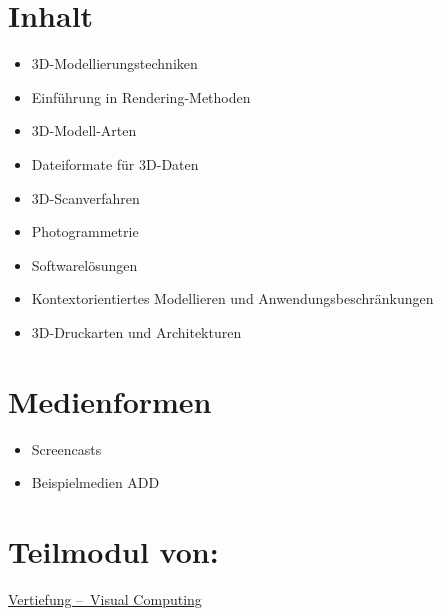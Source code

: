 \hypertarget{inhaltpathlabelmi-2017modulbeschreibungen-bachelorba_wpf-3d-msd}{%
\section*{Inhalt\label{/mi-2017/modulbeschreibungen-bachelor/BA_WPF-3D-MSD}}\label{inhaltpathlabelmi-2017modulbeschreibungen-bachelorba_wpf-3d-msd}}

\begin{itemize}
\tightlist
\item
  3D-Modellierungstechniken
\item
  Einführung in Rendering-Methoden
\item
  3D-Modell-Arten
\item
  Dateiformate für 3D-Daten
\item
  3D-Scanverfahren
\item
  Photogrammetrie
\item
  Softwarelösungen
\item
  Kontextorientiertes Modellieren und Anwendungsbeschränkungen
\item
  3D-Druckarten und Architekturen
\end{itemize}

\hypertarget{medienformenpathlabelmi-2017modulbeschreibungen-bachelorba_wpf-3d-msd}{%
\section*{Medienformen\label{/mi-2017/modulbeschreibungen-bachelor/BA_WPF-3D-MSD}}\label{medienformenpathlabelmi-2017modulbeschreibungen-bachelorba_wpf-3d-msd}}

\begin{itemize}
\tightlist
\item
  Screencasts
\item
  Beispielmedien ADD
\end{itemize}

\hypertarget{teilmodul-vonpathlabelmi-2017modulbeschreibungen-bachelorba_wpf-3d-msd}{%
\section*{Teilmodul
von:\label{/mi-2017/modulbeschreibungen-bachelor/BA_WPF-3D-MSD}}\label{teilmodul-vonpathlabelmi-2017modulbeschreibungen-bachelorba_wpf-3d-msd}}

\hyperref[/mi-2017/modulbeschreibungen-bachelor/BA_Vertiefung-Visual-Computing]{Vertiefung – Visual Computing}

